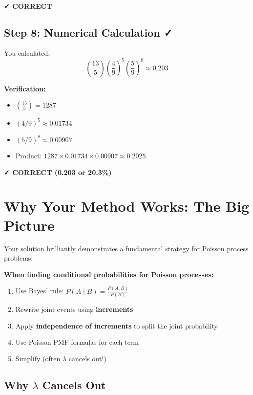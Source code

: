 \documentclass[11pt]{article}
\begin{document}
\textcolor{green!60!black}{\textbf{✓ CORRECT}}

\subsection{Step 8: Numerical Calculation ✓}

You calculated:
\[
\binom{13}{5} \left(\frac{4}{9}\right)^5 \left(\frac{5}{9}\right)^8 \approx 0.203
\]

\textbf{Verification:}
\begin{itemize}
    \item $\binom{13}{5} = 1287$
    \item $(4/9)^5 \approx 0.01734$
    \item $(5/9)^8 \approx 0.00907$
    \item Product: $1287 \times 0.01734 \times 0.00907 \approx 0.2025$
\end{itemize}

\textcolor{green!60!black}{\textbf{✓ CORRECT (0.203 or 20.3\%)}}

\section{Why Your Method Works: The Big Picture}

Your solution brilliantly demonstrates a fundamental strategy for Poisson process problems:

\begin{tcolorbox}[colback=yellow!10!white,colframe=orange!75!black,title=Problem-Solving Strategy]
\textbf{When finding conditional probabilities for Poisson processes:}
\begin{enumerate}
    \item Use Bayes' rule: $P(A \mid B) = \frac{P(A, B)}{P(B)}$
    \item Rewrite joint events using \textbf{increments}
    \item Apply \textbf{independence of increments} to split the joint probability
    \item Use Poisson PMF formulas for each term
    \item Simplify (often $\lambda$ cancels out!)
\end{enumerate}
\end{tcolorbox}

\subsection{Why $\lambda$ Cancels Out}
\end{document}
